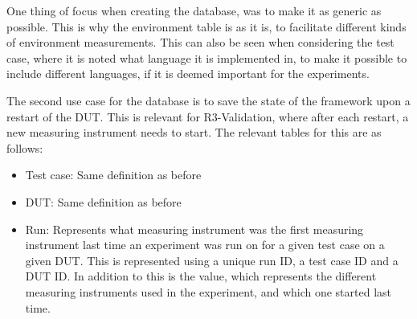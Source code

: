 One thing of focus when creating the database, was to make it as generic as possible. This is why the environment table is as it is, to facilitate different kinds of environment measurements. This can also be seen when considering the test case, where it is noted what language it is implemented in, to make it possible to include different languages, if it is deemed important for the experiments.\newline


The second use case for the database is to save the state of the framework upon a restart of the DUT. This is relevant for R3-Validation, where after each restart, a new measuring instrument needs to start. The relevant tables for this are as follows:

\begin{itemize}
    \item Test case: Same definition as before
    \item DUT: Same definition as before
    \item Run: Represents what measuring instrument was the first measuring instrument last time an experiment was run on for a given test case on a given DUT. This is represented using a unique run ID, a test case ID and a DUT ID. In addition to this is the value, which represents the different measuring instruments used in the experiment, and which one started last time.
\end{itemize}


